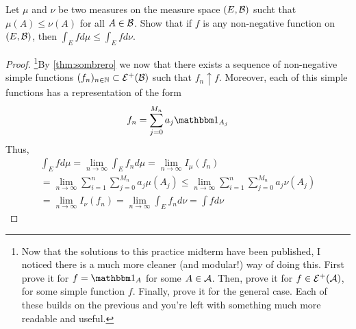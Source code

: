 \begin{ex}
	Let $\mu$ and $\nu$ be two measures on the measure space $(E, \mathcal{B})$ sucht that $\mu(A) \leq \nu(A)$ for all $A \in \mathcal{B}$. Show that if $f$ is any non-negative function on $(E, \mathcal{B})$, then $\int_E f d\mu \leq \int_E f d\nu$.
\end{ex}

\begin{proof}
	\footnote{Now that the solutions to this practice midterm have been published, I noticed there is a much more cleaner (and modular!) way of doing this. First prove it for $f = \ind_A$ for some $A\in \mathcal{A}$. Then, prove it for $f \in \mathcal{E}^+(\mathcal{A})$, for some simple function $f$. Finally, prove it for the general case. Each of these builds on the previous and you're left with something much more readable and useful.}By \autoref{thm:sombrero} we now that there exists a sequence of non-negative simple functions $(f_n)_{n\in\mathbb{N}} \subset \mathcal{E}^+(\mathcal{B})$ such that $f_n \uparrow f$. Moreover, each of this simple functions has a representation of the form
	\begin{align*}
		f_n = \sum_{j=0}^{M_n} a_j \ind_{A_j}
	\end{align*}
	Thus,
	\begin{multline*}
		\int_E fd\mu
		= \lim_{n \to \infty} \int_E f_n d\mu
		= \lim_{n \to \infty} I_\mu(f_n) \\
		= \lim_{n \to \infty} \sum_{i = 1}^n \sum_{j=0}^{M_n} a_j \mu(A_j)
		\leq \lim_{n \to \infty} \sum_{i = 1}^n \sum_{j = 0}^{M_n} a_j \nu(A_j) \\
		= \lim_{n \to \infty} I_\nu(f_n) 
		= \lim_{n \to \infty} \int_E f_n d\nu
		= \int fd\nu
	\end{multline*}
\end{proof}